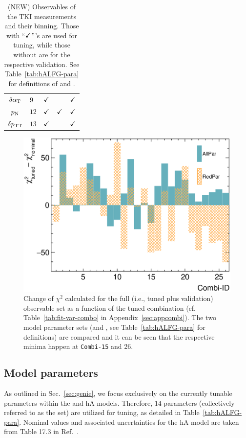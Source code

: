 \begin{table}[!htb]
\begin{tabular}{cp{1.1cm}p{1.5cm}p{1.5cm}p{1.5cm}}
    \hline
      $\delta\alpha_\textrm{T}$            & $9$               & $\checkmark$      & & $\checkmark$      \\  
      $p_\textrm{N}$             & $12$               & $\checkmark$     & $\checkmark$  & $\checkmark$ \\ 
      $\delta p_\textrm{TT}$           & $13$               & $\checkmark$     &  & $\checkmark$  \\
    \hline
    \hline
    \end{tabular}
    \caption{\label{tab:data-sets}
	(NEW) Observables of the TKI measurements and their binning. Those with ``$\checkmark$'''s are used for tuning, while those without  are for the respective validation. See Table~\ref{tab:hALFG-para} for definitions of \cbRedPar and \cbAllPar.
    }
\end{table}



\begin{figure}[!htb] 
    \centering 		
    \includegraphics[width=\sgfigwid\textwidth]{figures/chi2_hist_covfix.eps} 
    \caption{\label{fig:allchi} Change of $\chi^2$ calculated for the full (i.e., tuned plus validation) observable set as a function of the tuned combination (cf. Table~\ref{tab:fit-var-combo} in Appendix~\ref{sec:appcombi}). The two model parameter sets (\allpar and \redpar, see Table~\ref{tab:hALFG-para} for definitions) are compared and it can be seen that the respective minima happen at \texttt{Combi-15} and 26. }   
\end{figure}

\subsection{\label{sec:tuning-para-choice} Model parameters}
As outlined in Sec.~\ref{sec:genie}, we focus exclusively on the currently tunable parameters within the \sfcfg and hA models. Therefore, $14$ parameters (collectively referred to as the \allpar set) are utilized for tuning, as detailed in Table~\ref{tab:hALFG-para}. Nominal values and associated uncertainties for the hA model are taken from Table 17.3 in Ref.~\cite{Andreopoulos:2015wxa}. 

